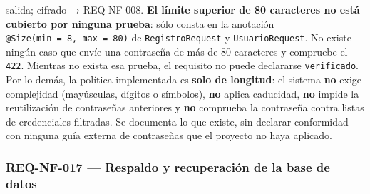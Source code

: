 \documentclass[
  spanish,
]{article}
\begin{document}
\begin{itemize}
  salida; cifrado → REQ-NF-008. \textbf{El límite superior de 80
  caracteres no está cubierto por ninguna prueba}: sólo consta en la
  anotación \texttt{@Size(min\ =\ 8,\allowbreak{}\ max\ =\ 80)} de
  \texttt{Registro\allowbreak{}Request} y \texttt{Usuario\allowbreak{}Request}. No existe ningún
  caso que envíe una contraseña de más de 80 caracteres y compruebe el
  \texttt{422}. Mientras no exista esa prueba, el requisito no puede
  declararse \texttt{verificado}. Por lo demás, la política implementada
  es \textbf{solo de longitud}: el sistema \textbf{no} exige complejidad
  (mayúsculas, dígitos o símbolos), \textbf{no} aplica caducidad,
  \textbf{no} impide la reutilización de contraseñas anteriores y
  \textbf{no} comprueba la contraseña contra listas de credenciales
  filtradas. Se documenta lo que existe, sin declarar conformidad con
  ninguna guía externa de contraseñas que el proyecto no haya aplicado.
\end{itemize}

\subsubsection{REQ-NF-017 --- Respaldo y recuperación de la base de
datos}\label{req-nf-017-respaldo-y-recuperaciuxf3n-de-la-base-de-datos}
\end{document}

